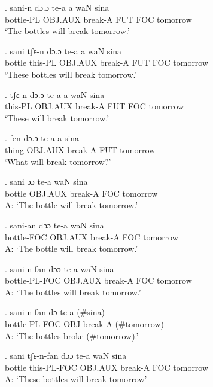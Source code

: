 \documentclass{assets/fieldnotes}
\begin{document}
\exg.
sani-n      dɔ.ɔ      te-a      a     waN   sina     \\
bottle-PL   OBJ.AUX   break-A   FUT   FOC   tomorrow \\%
`The bottles will break tomorrow.'

\exg.
sani     tʃɛ-n     dɔ.ɔ      te-a      a     waN   sina     \\
bottle   this-PL   OBJ.AUX   break-A   FUT   FOC   tomorrow \\%
`These bottles will break tomorrow.'

\exg.
tʃɛ-n     dɔ.ɔ      te-a      a     waN   sina     \\
this-PL   OBJ.AUX   break-A   FUT   FOC   tomorrow \\%
`These will break tomorrow.'

\exg.
fen     dɔ.ɔ      te-a      a     sina     \\
thing   OBJ.AUX   break-A   FUT   tomorrow \\%
`What will break tomorrow?'

\exg.
sani     ɔɔ        te-a      waN   sina     \\
bottle   OBJ.AUX   break-A   FOC   tomorrow \\%
A: `The bottle will break tomorrow.' \label{96773}


\exg. 
sani-an      dɔɔ       te-a      waN   sina     \\
bottle-FOC   OBJ.AUX   break-A   FOC   tomorrow \\%
A: `The bottle will break tomorrow.'

\exg.
sani-n-fan      dɔɔ       te-a      waN   sina     \\
bottle-PL-FOC   OBJ.AUX   break-A   FOC   tomorrow \\%
A: `The bottles will break tomorrow.'

\exg.
sani-n-fan      dɔ    te-a      (\#sina)     \\
bottle-PL-FOC   OBJ   break-A   (\#tomorrow) \\%
A: `The bottles broke (\#tomorrow).' \label{69764}


\exg.
sani     tʃɛ-n-fan     dɔɔ       te-a      waN   sina     \\
bottle   this-PL-FOC   OBJ.AUX   break-A   FOC   tomorrow \\%
A: `These bottles will break tomorrow'
\end{document}
